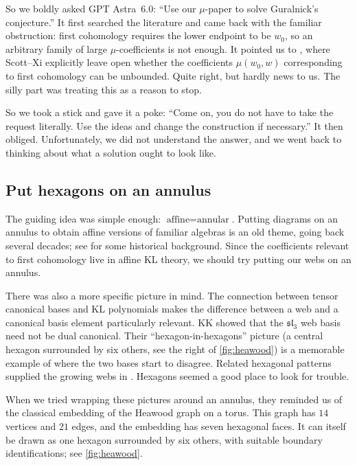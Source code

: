 \documentclass[a4paper,11pt]{amsart}
\numberwithin{equation}{subsection}
\theoremstyle{plain}
\theoremstyle{definition}
\theoremstyle{remark}
\begin{document}
So we boldly asked GPT Astra~6.0:
``Use our $\mu$-paper to solve Guralnick's conjecture.''
It first searched the literature and came back with the
familiar obstruction: first cohomology requires the lower
endpoint to be $w_0$, so an arbitrary family of large
$\mu$-coefficients is not enough.
It pointed us to \cite[Section~4, final remark]{SX}, where
Scott--Xi explicitly leave open whether the coefficients
$\mu(w_0,w)$ corresponding to first cohomology can be
unbounded. Quite right, but hardly news to us.
The silly part was treating this as a reason to stop.

So we took a stick and gave it a poke:
``Come on, you do not have to take the request literally.
Use the ideas and change the construction if necessary.''
It then obliged. Unfortunately, we did not understand
the answer, and we went back to thinking about
what a solution ought to look like.

\subsection{Put hexagons on an annulus}

The guiding idea was simple enough:
$\text{affine}=\text{annular}$.
Putting diagrams on an annulus to obtain affine versions of
familiar algebras is an old theme, going back several decades;
see \cite[Section~1B]{HT} for some historical background.
Since the coefficients relevant to first cohomology live
in affine KL theory, we should try putting our webs on
an annulus.

There was also a more specific picture in mind.
The connection between tensor canonical bases and KL
polynomials \cite{FKK} makes the difference between a web
and a canonical basis element particularly relevant.
KK \cite{KK99} showed that the
$\mathfrak{sl}_3$ web basis need not be dual canonical.
Their ``hexagon-in-hexagons'' picture (a central hexagon
surrounded by six others, see the 
right of \autoref{fig:heawood}) is a memorable example of where
the two bases start to disagree.
Related hexagonal patterns supplied the growing webs in
\cite{Finite}. Hexagons seemed a good place to look for trouble.

When we tried wrapping these pictures around an annulus,
they reminded us of the classical embedding of the Heawood
graph on a torus. This graph has $14$ vertices and $21$ edges,
and the embedding has seven hexagonal faces.
It can itself be drawn as one hexagon surrounded by six
others, with suitable boundary identifications;
see \autoref{fig:heawood}.
\end{document}
